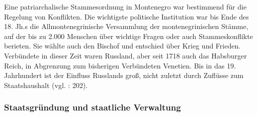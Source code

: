 Eine patriarchalische Stammesordnung in Montenegro war bestimmend für die Regelung von Konflikten. 
Die wichtigste politische Institution war bis Ende des 18. Jh.s die Allmontenegrinische Versammlung der montenegrinischen Stämme, auf der bis zu 2.000 Menschen über wichtige Fragen oder auch Stammeskonflikte berieten. Sie wählte auch den Bischof und entschied über Krieg und Frieden. Verbündete in dieser Zeit waren Russland, aber seit 1718 auch das Habsburger Reich, in Abgrenzung zum bisherigen Verbündeten Venetien. Bis in das 19. Jahrhundert ist der Einfluss Russlands groß, nicht zuletzt durch Zuflüsse zum Staatshaushalt (vgl. \cite{weithmann}: 202).\par

\subsubsection{Staatsgründung und staatliche Verwaltung }


